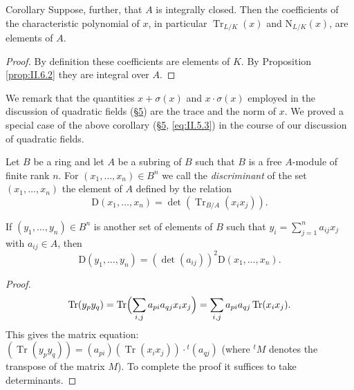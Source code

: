 \begin{statement}{Corollary}
Suppose, further, that $A$ is integrally closed. Then the coefficients of
the characteristic polynomial of $x$, in particular
$\operatorname{Tr}_{L/K}(x)$ and $\mathrm{N}_{L/K}(x)$, are elements of $A$.
\end{statement}

\begin{proof}
By definition these coefficients are elements of $K$. By Proposition
\ref{prop:II.6.2} they are integral over $A$.
\end{proof}

We remark that the quantities $x+\sigma(x)$ and $x\cdot\sigma(x)$ employed in
the discussion of quadratic fields (\hyperref[sec:2.5]{§5}) are the trace and the norm of $x$.
We proved a special case of the above corollary (\hyperref[sec:2.5]{§5}, \eqref{eq:II.5.3}) in
the course of our discussion of quadratic fields.


\begin{definition}
\label{def:II.7.1}
Let $B$ be a ring and let $A$ be a subring of $B$ such that $B$ is a free
$A$-module of finite rank $n$. For $(x_{1},\ldots,x_{n})\in B^{n}$ we call
the \emph{discriminant} of the set $(x_{1},\ldots,x_{n})$ the element of $A$
defined by the relation
\begin{equation}
\mathrm{D}(x_{1},\ldots,x_{n})=\det(\operatorname{Tr}_{B/A}(x_{i}x_{j})).
\label{eq:II.7.1}
\end{equation}
\end{definition}

\begin{proposition}
\label{prop:II.7.1}
If $(y_{1},\ldots,y_{n})\in B^{n}$ is another set of elements of $B$ such
that $y_{i}=\sum_{j=1}^{n}a_{ij}x_{j}$ with $a_{ij}\in A$, then
\begin{equation}
\mathrm{D}(y_{1},\ldots,y_{n})=(\det(a_{ij}))^{2}
\mathrm{D}(x_{1},\ldots,x_{n}).
\label{eq:II.7.2}
\end{equation}
\end{proposition}

\begin{proof}
\[
\operatorname{Tr}(y_{p}y_{q})
=\operatorname{Tr}\Bigl(\sum_{i,j}a_{pi}a_{qj}x_{i}x_{j}\Bigr)
=\sum_{i,j}a_{pi}a_{qj}\operatorname{Tr}(x_{i}x_{j}).
\]
This gives the matrix equation:
$(\operatorname{Tr}(y_{p}y_{q}))=(a_{pi})(\operatorname{Tr}(x_{i}x_{j}))
\cdot{}^{t}(a_{qj})$ (where ${}^{t}M$ denotes the transpose of the matrix
$M$). To complete the proof it suffices to take determinants.
\end{proof}

